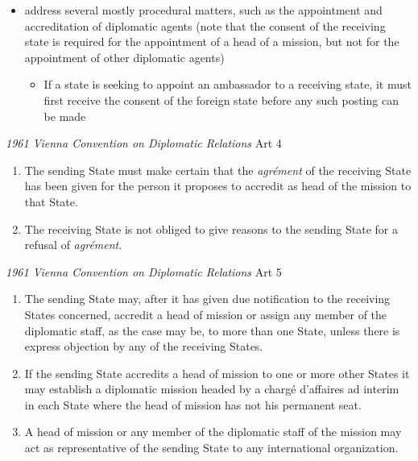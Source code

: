 \begin{itemize}
    \item {} address several mostly procedural matters, such as the appointment and accreditation of diplomatic agents (note that the consent of the receiving state is required for the appointment of a head of a mission, but not for the appointment of other diplomatic agents)
    \begin{itemize}
        \item If a state is seeking to appoint an ambassador to a receiving state, it must first receive the consent of the foreign state before any such posting can be made
    \end{itemize}
\end{itemize}

\begin{conventiondetails}{\textit{1961 Vienna Convention on Diplomatic Relations} Art 4}
    \flushleft
    \begin{enumerate}
        \item The sending State must make certain that the \textit{agrément} of the receiving State has been given for the person it proposes to accredit as head of the mission to that State.
        \item The receiving State is not obliged to give reasons to the sending State for a refusal of \textit{agrément}.
    \end{enumerate}
\end{conventiondetails}

\begin{conventiondetails}{\textit{1961 Vienna Convention on Diplomatic Relations} Art 5}
    \flushleft
    \begin{enumerate}
        \item The sending State may, after it has given due notification to the receiving States concerned, accredit a head of mission or assign any member of the diplomatic staff, as the case may be, to more than one State, unless there is express objection by any of the receiving States.
        \item If the sending State accredits a head of mission to one or more other States it may establish a diplomatic mission headed by a chargé d'affaires ad interim in each State where the head of mission has not his permanent seat.
        \item A head of mission or any member of the diplomatic staff of the mission may act as
        representative of the sending State to any international organization.
    \end{enumerate}
\end{conventiondetails}

